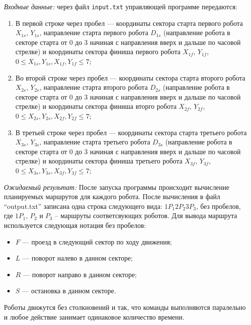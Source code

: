 \begin{enumerate}
\begin{enumerate}
\begin{enumerate}
            \textit{Входные данные:} через файл \texttt{input.txt} управляющей программе передаются:
            \begin{enumerate}
                \item В первой строке через пробел --- координаты сектора старта первого робота $X_{1s}$, $Y_{1s}$,
                        направление старта первого робота $D_{1s}$ (направление робота в секторе старта от 0 до 3
                        начиная с направления вверх и дальше по часовой стрелке) и координаты сектора
                        финиша первого робота $X_{1f}$, $Y_{1f}$,  $0 \le X_{1s}, Y_{1s}, X_{1f}, Y_{1f} \le 7$;
                \item Во второй строке через пробел --- координаты сектора старта второго робота $X_{2s}$, $Y_{2s}$,
                        направление старта второго робота $D_{2s}$ (направление робота в секторе старта от 0 до 3
                        начиная с направления вверх и дальше по часовой стрелке) и координаты сектора
                        финиша вторго робота $X_{2f}$, $Y_{2f}$,  $0 \le X_{2s}, Y_{2s}, X_{2f}, Y_{2f} \le 7$;
                \item В третьей строке через пробел --- координаты сектора старта третьего робота $X_{3s}$, $Y_{3s}$,
                        направление старта третьего робота $D_{3s}$ (направление робота в секторе старта от 0 до 3
                        начиная с направления вверх и дальше по часовой стрелке) и координаты сектора
                        финиша третьего робота $X_{3f}$, $Y_{3f}$,  $0 \le X_{3s}, Y_{3s}, X_{3f}, Y_{3f} \le 7$;
            \end{enumerate}

            \textit{Ожидаемый результат:} После запуска программы происходит вычисление планируемых маршрутов для каждого
                    робота. После вычисления в файл ``output.txt'' записана одна строка следующего вида:
                    $1P_{1}2P_{2}3P_3$, без пробелов, где $1P_{1}$, $P_{2}$ и $P_3$ -- маршруты соответсвующих роботов.
                    Для вывода маршрута используется следующая нотация без пробелов:
                    \begin{itemize}
                        \item $F$ --- проезд в следующий сектор по ходу движения;
                        \item $L$ --- поворот налево в данном секторе;
                        \item $R$ --- поворот направо в данном секторе;
                        \item $S$ --- остановка в данном секторе.
                    \end{itemize}
                    Роботы движутся без столкновений и так, что команды выполняются паралельно
                    и любое действие занимает одинаковое количество времени.
        \end{enumerate}



\end{enumerate}
\end{enumerate}
